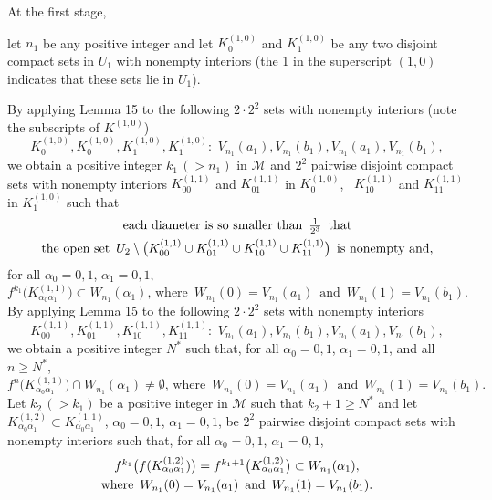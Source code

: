 \documentclass[12pt]{article}
\newcommand{\al}{\alpha}
\begin{document}
At the first stage, 

let $n_1$ be any positive integer and let $K_0^{(1,0)}$ and $K_1^{(1,0)}$ be any two disjoint compact sets in $U_1$ with nonempty interiors \big(the 1 in the superscript $(1,0)$ indicates that these sets lie in $U_1$\big).

By applying Lemma 15 to the following $2 \cdot 2^2$ sets with nonempty interiors \big(note the subscripts of $K^{(1,0)}$\big)
$$
K_0^{(1,0)}, K_0^{(1,0)}, K_1^{(1,0)}, K_1^{(1,0)}: \,\, V_{n_1}(a_1), V_{n_1}(b_1), V_{n_1}(a_1), V_{n_1}(b_1),
$$ 
we obtain a positive integer $k_1 \, (> n_1)$ in $\mathcal M$ and $2^2$ pairwise disjoint compact sets with nonempty interiors $K_{00}^{(1,1)}$ and $K_{01}^{(1,1)}$ in $K_{0}^{(1,0)}$, \, $K_{10}^{(1,1)}$ and $K_{11}^{(1,1)}$ in $K_{1}^{(1,0)}$ such that  
\begin{multline*}
$$
\text{each diameter is so smaller than} \,\,\, \frac 1{2^3} \,\,\, \text{that} \\ 
\text{the open set} \,\,\, 
U_2 \setminus \big(K_{00}^{(1,1)} \cup K_{01}^{(1,1)} \cup K_{10}^{(1,1)} \cup K_{11}^{(1,1)}\big) \,\,\, \text{is nonempty and},
$$
\end{multline*}
for all $\al_0 = 0, 1$, $\al_1 = 0, 1$, 
$$
f^{k_1}\big(K_{\al_0\al_1}^{(1,1)}\big) \subset W_{n_1}(\al_1), \, \text{where} \,\,\, W_{n_1}(0) = V_{n_1}(a_1) \,\,\, \text{and} \,\,\, W_{n_1}(1) = V_{n_1}(b_1).%
$$
\indent By applying Lemma 15 to the following $2 \cdot 2^2$ sets with nonempty interiors  
$$
K_{00}^{(1,1)}, K_{01}^{(1,1)}, K_{10}^{(1,1)}, K_{11}^{(1,1)}: \,\, V_{n_1}(a_1), V_{n_1}(b_1), V_{n_1}(a_1), V_{n_1}(b_1),
$$ 
we obtain a positive integer $N^*$ such that,
for all $\al_0 = 0, 1$, $\al_1 = 0, 1$, and all $n \ge N^*$, 
$$
f^n\big(K_{\al_0\al_1}^{(1,1)}\big) \cap W_{n_1}(\al_1) \ne \emptyset, \, \text{where} \,\,\, W_{n_1}(0) = V_{n_1}(a_1) \,\,\, \text{and} \,\,\, W_{n_1}(1) = V_{n_1}(b_1).
$$
\indent Let $k_2 \, (> k_1)$ be a positive integer in $\mathcal M$ such that $k_2 +1 \ge N^*$ and let $K_{\al_0\al_1}^{(1,2)} \subset K_{\al_0\al_1}^{(1,1)}$, $\al_0 = 0, 1$, $\al_1 = 0, 1$, be $2^2$ pairwise disjoint compact sets with nonempty interiors such that,  
for all $\al_0 = 0, 1$, $\al_1 = 0, 1$, 
{\large 
\begin{multline*}
$$
f^{k_1}\big(f(K_{\al_0\al_1}^{(1,2)})\big) = f^{k_1+1}\big(K_{\al_0\al_1}^{(1,2)}\big) \subset W_{n_1}(\al_1), \\ \text{where} \,\,\, W_{n_1}(0) = V_{n_1}(a_1) \,\,\, \text{and} \,\,\, W_{n_1}(1) = V_{n_1}(b_1).
$$
\end{multline*}}
\end{document}
